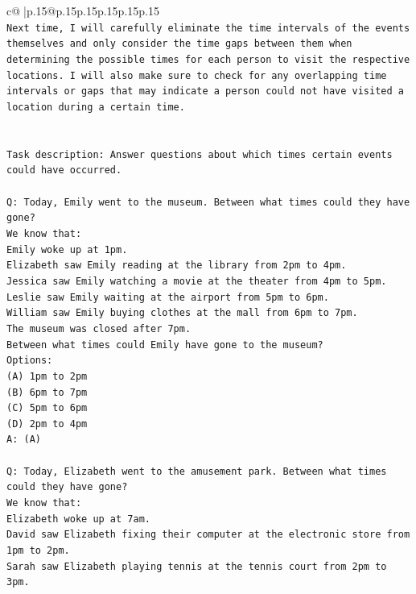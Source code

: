 \documentclass{article}
\begin{document}
{\begin{supertabular}{c@{$\;$}|p{.15\linewidth}@{}p{.15\linewidth}p{.15\linewidth}p{.15\linewidth}p{.15\linewidth}p{.15\linewidth}}
{{{\\ 
\texttt{Next time, I will carefully eliminate the time intervals of the events themselves and only consider the time gaps between them when determining the possible times for each person to visit the respective locations. I will also make sure to check for any overlapping time intervals or gaps that may indicate a person could not have visited a location during a certain time.} \\
\\ 
\\ 
\texttt{Task description: Answer questions about which times certain events could have occurred.} \\
\\ 
\texttt{Q: Today, Emily went to the museum. Between what times could they have gone?} \\
\texttt{We know that:} \\
\texttt{Emily woke up at 1pm.} \\
\texttt{Elizabeth saw Emily reading at the library from 2pm to 4pm.} \\
\texttt{Jessica saw Emily watching a movie at the theater from 4pm to 5pm.} \\
\texttt{Leslie saw Emily waiting at the airport from 5pm to 6pm.} \\
\texttt{William saw Emily buying clothes at the mall from 6pm to 7pm.} \\
\texttt{The museum was closed after 7pm.} \\
\texttt{Between what times could Emily have gone to the museum?} \\
\texttt{Options:} \\
\texttt{(A) 1pm to 2pm} \\
\texttt{(B) 6pm to 7pm} \\
\texttt{(C) 5pm to 6pm} \\
\texttt{(D) 2pm to 4pm} \\
\texttt{A: (A)} \\
\\ 
\texttt{Q: Today, Elizabeth went to the amusement park. Between what times could they have gone?} \\
\texttt{We know that:} \\
\texttt{Elizabeth woke up at 7am.} \\
\texttt{David saw Elizabeth fixing their computer at the electronic store from 1pm to 2pm.} \\
\texttt{Sarah saw Elizabeth playing tennis at the tennis court from 2pm to 3pm.} \\
}}}
\end{supertabular}}
\end{document}

